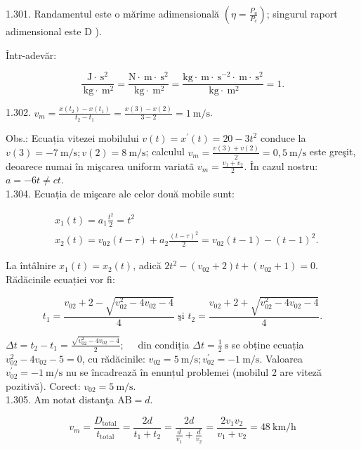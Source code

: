 1.301. Randamentul este o mărime adimensională $\left(\eta=\frac{P_{u}}{P_{c}}\right)$; singurul raport adimensional este D ).

Într-adevăr:

$$
\frac{\mathrm{J} \cdot \mathrm{~s}^{2}}{\mathrm{~kg} \cdot \mathrm{~m}^{2}}=\frac{\mathrm{N} \cdot \mathrm{~m} \cdot \mathrm{~s}^{2}}{\mathrm{~kg} \cdot \mathrm{~m}^{2}}=\frac{\mathrm{kg} \cdot \mathrm{~m} \cdot \mathrm{~s}^{-2} \cdot \mathrm{~m} \cdot \mathrm{~s}^{2}}{\mathrm{~kg} \cdot \mathrm{~m}^{2}}=1 .
$$

1.302. $v_{m}=\frac{x\left(t_{2}\right)-x\left(t_{1}\right)}{t_{2}-t_{1}}=\frac{x(3)-x(2)}{3-2}=1 \mathrm{~m} / \mathrm{s}$.

Obs.: Ecuația vitezei mobilului $v(t)=x^{\prime}(t)=20-3 t^{2}$ conduce la $v(3)=-7 \mathrm{~m} / \mathrm{s} ; v(2)=8 \mathrm{~m} / \mathrm{s}$; calculul $v_{m}=\frac{v(3)+v(2)}{2}=0,5 \mathrm{~m} / \mathrm{s}$ este greşit, deoarece numai în mişcarea uniform variatã $v_{m}=\frac{v_{1}+v_{2}}{2}$. În cazul nostru: $a=-6 t \neq c t$.\\
1.304. Ecuația de mişcare ale celor două mobile sunt:

$$
\begin{aligned}
& x_{1}(t)=a_{1} \frac{t^{2}}{2}=t^{2} \\
& x_{2}(t)=v_{02}(t-\tau)+a_{2} \frac{(t-\tau)^{2}}{2}=v_{02}(t-1)-(t-1)^{2} .
\end{aligned}
$$

La întâlnire $x_{1}(t)=x_{2}(t)$, adică $2 t^{2}-\left(v_{02}+2\right) t+\left(v_{02}+1\right)=0$. Rădăcinile ecuației vor fi:

$$
t_{1}=\frac{v_{02}+2-\sqrt{v_{02}^{2}-4 v_{02}-4}}{4} \text { şi } t_{2}=\frac{v_{02}+2+\sqrt{v_{02}^{2}-4 v_{02}-4}}{4} .
$$

$\Delta t=t_{2}-t_{1}=\frac{\sqrt{v_{02}^{2}-4 v_{02}-4}}{2} ; \quad$ din condiția $\Delta t=\frac{1}{2} \mathrm{~s}$ se obține ecuația $v_{02}^{2}-4 v_{02}-5=0$, cu rădăcinile: $v_{02}=5 \mathrm{~m} / \mathrm{s} ; v_{02}^{\prime}=-1 \mathrm{~m} / \mathrm{s}$. Valoarea $v_{02}^{\prime}=-1 \mathrm{~m} / \mathrm{s}$ nu se încadrează în enunțul problemei (mobilul 2 are viteză pozitivă). Corect: $v_{02}=5 \mathrm{~m} / \mathrm{s}$.\\
1.305. Am notat distanţa $\mathrm{AB}=d$.

$$
v_{m}=\frac{D_{\text {total }}}{t_{\text {total }}}=\frac{2 d}{t_{1}+t_{2}}=\frac{2 d}{\frac{d}{v_{1}}+\frac{d}{v_{2}}}=\frac{2 v_{1} v_{2}}{v_{1}+v_{2}}=48 \mathrm{~km} / \mathrm{h}
$$


